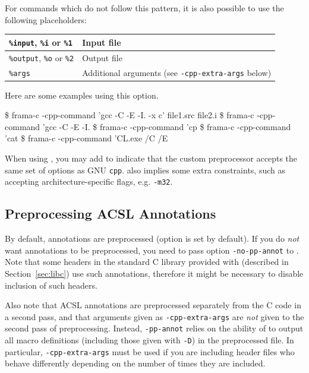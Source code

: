 For commands which do not follow this pattern, it is also possible to use
the following placeholders:

\begin{tabular}{|l|l|}
\hline
\texttt{\%input}, \texttt{\%i} or \texttt{\%1} & Input file \\
\hline
\texttt{\%output}, \texttt{\%o} or \texttt{\%2} & Output file \\
\hline
\texttt{\%args} & Additional arguments (see \texttt{-cpp-extra-args} below)\\
\hline
\end{tabular}

Here are some examples using this option.
\begin{frama-c-commands}
\$ frama-c -cpp-command 'gcc -C -E -I. -x c' file1.src file2.i
\$ frama-c -cpp-command 'gcc -C -E -I. %
\$ frama-c -cpp-command 'cp %
\$ frama-c -cpp-command 'cat %
\$ frama-c -cpp-command 'CL.exe /C /E %
\end{frama-c-commands}

When using , you may add 
to indicate that the custom preprocessor accepts the same set of options as GNU
\texttt{cpp}.
 also implies some extra
constraints, such as accepting architecture-specific flags, e.g. \texttt{-m32}.

\subsection*{Preprocessing ACSL Annotations}

By default, \acsl annotations are preprocessed (option 
is set by default).
If you do \emph{not} want annotations to be preprocessed, you need to pass
option \texttt{-no-pp-annot} to \FramaC. Note that some headers in the
standard C library provided with \FramaC (described in Section~\ref{sec:libc})
use such annotations,
therefore it might be necessary to disable inclusion of such headers.

Also note that ACSL annotations are preprocessed separately from the C
code in a second pass, and that arguments given as \texttt{-cpp-extra-args} are
\emph{not} given to the second pass of preprocessing. Instead,
\texttt{-pp-annot} relies on the ability of \gcc to output all
macro definitions (including those given with \texttt{-D}) in the
preprocessed file. In particular, \texttt{-cpp-extra-args} must be
used if you are including header files who behave differently
depending on the number of times they are included.

